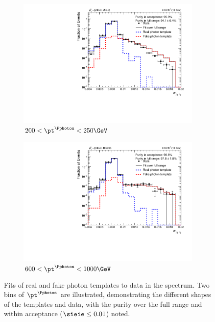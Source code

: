 \begin{figure}[htbp]
    \centering
    \begin{subfigure}[b]{0.49\textwidth}
        \includegraphics[width=\textwidth]{figures/photon_purity/2017/fit_200.0_to_250.0.pdf}
        \caption{$\text{200} < \pt^{\Pphoton} < \text{250\GeV}$}
    \end{subfigure}
    \hfill
    \begin{subfigure}[b]{0.49\textwidth}
        \includegraphics[width=\textwidth]{figures/photon_purity/2017/fit_600.0_to_1000.0.pdf}
        \caption{$\text{600} < \pt^{\Pphoton} < \text{1000\GeV}$}
    \end{subfigure}
    \caption[Fits of real and fake photon templates to data in the \sieie spectrum]{Fits of real and fake photon templates to data in the \sieie spectrum. Two bins of $\pt^{\Pphoton}$ are illustrated, demonstrating the different shapes of the templates and data, with the purity over the full range and within acceptance ($\sieie \leq \text{0.01}$) noted.}
    \label{fig:htoinv_photon_purity_fits}
\end{figure}

